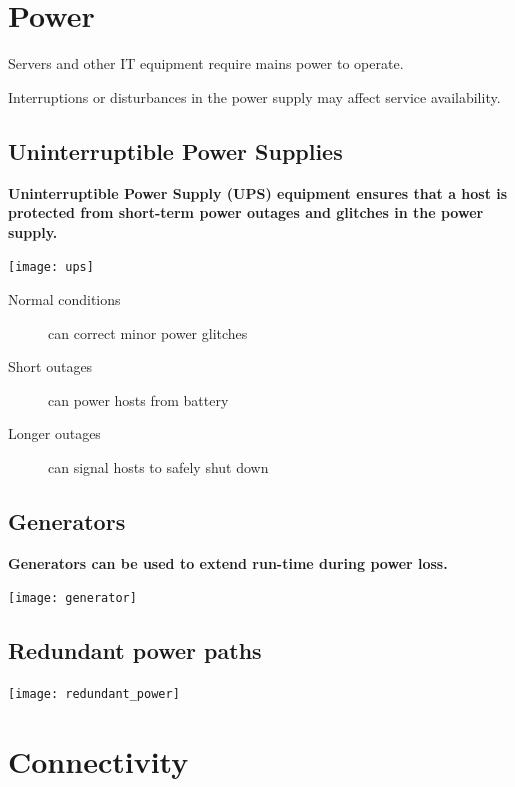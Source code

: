 \documentclass[slides]{pgnotes}
\begin{document}
\section{Power}

Servers and other IT equipment require mains power to operate.

Interruptions or disturbances in the power supply may affect service availability.

\subsection{Uninterruptible Power Supplies}

\textbf{Uninterruptible Power Supply (UPS) equipment ensures that a host is protected from short-term power outages and glitches in the power supply.}

\begin{center}
\texttt{[image: ups]}
\end{center}

\begin{description}
\item[Normal conditions] can correct minor power glitches
\item[Short outages] can power hosts from battery
\item[Longer outages] can signal hosts to safely shut down
\end{description}

\subsection{Generators}

\textbf{Generators can be used to extend run-time during power loss.}

\begin{center}
\texttt{[image: generator]}
\end{center}

\subsection{Redundant power paths}

\begin{center}
\texttt{[image: redundant\_power]}
\end{center}


\section{Connectivity}
\end{document}
